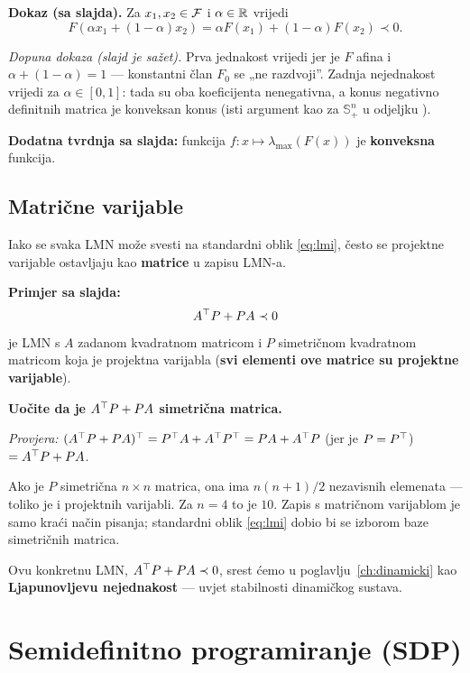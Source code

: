 \textbf{Dokaz (sa slajda).} Za $x_1, x_2 \in \mathcal{F}$ i $\alpha \in \mathbb{R}$ vrijedi
\[
F(\alpha x_1 + (1-\alpha)x_2) = \alpha F(x_1) + (1-\alpha)F(x_2) \prec 0.
\]

\emph{Dopuna dokaza (slajd je sažet).} Prva jednakost vrijedi jer je $F$ afina
i $\alpha + (1-\alpha) = 1$ --- konstantni član $F_0$ se „ne razdvoji”. Zadnja
nejednakost vrijedi za $\alpha \in [0,1]$: tada su oba koeficijenta
nenegativna, a konus negativno definitnih matrica je konveksan konus (isti
argument kao za $\mathbb{S}^n_+$ u odjeljku ). \checkmark

\textbf{Dodatna tvrdnja sa slajda:} funkcija
$f : x \mapsto \lambda_{\max}(F(x))$ je \textbf{konveksna} funkcija.

\subsection{Matrične varijable}

Iako se svaka LMN može svesti na standardni oblik \eqref{eq:lmi}, često se
projektne varijable ostavljaju kao \textbf{matrice} u zapisu LMN-a.

\textbf{Primjer sa slajda:}
\[
A^{\top} P + PA \prec 0
\]
je LMN s $A$ zadanom kvadratnom matricom i $P$ simetričnom kvadratnom
matricom koja je projektna varijabla (\textbf{svi elementi ove matrice su
projektne varijable}).

\textbf{Uočite da je $A^{\top} P + PA$ simetrična matrica.}

\emph{Provjera:} $(A^{\top} P + PA)^{\top} = P^{\top} A + A^{\top} P^{\top} = PA + A^{\top} P$ (jer je
$P = P^{\top}$) $= A^{\top} P + PA$. \checkmark

\begin{napomena}
Ako je $P$ simetrična $n\times n$ matrica, ona ima $n(n+1)/2$ nezavisnih
elemenata --- toliko je i projektnih varijabli. Za $n = 4$ to je $10$. Zapis s
matričnom varijablom je samo kraći način pisanja; standardni oblik
\eqref{eq:lmi} dobio bi se izborom baze simetričnih matrica.

Ovu konkretnu LMN, $A^{\top} P + PA \prec 0$, srest ćemo u
poglavlju~\ref{ch:dinamicki} kao \textbf{Ljapunovljevu nejednakost} --- uvjet
stabilnosti dinamičkog sustava.
\end{napomena}

\section{Semidefinitno programiranje (SDP)}

